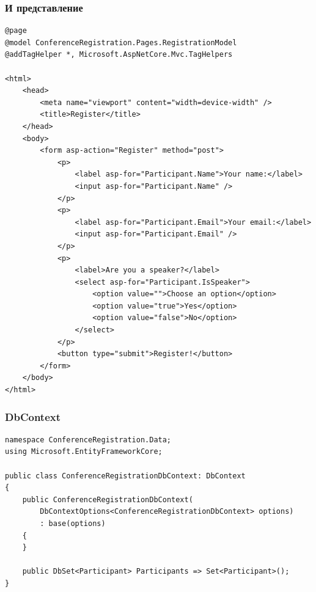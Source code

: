 \documentclass{../../slides-style}
\begin{document}
    \begin{frame}[fragile]
        \frametitle{И представление}
        \begin{ssmall}
            \begin{verbatim}
@page
@model ConferenceRegistration.Pages.RegistrationModel
@addTagHelper *, Microsoft.AspNetCore.Mvc.TagHelpers

<html>
    <head>
        <meta name="viewport" content="width=device-width" />
        <title>Register</title>
    </head>
    <body>
        <form asp-action="Register" method="post">
            <p>
                <label asp-for="Participant.Name">Your name:</label>
                <input asp-for="Participant.Name" />
            </p>
            <p>
                <label asp-for="Participant.Email">Your email:</label>
                <input asp-for="Participant.Email" />
            </p>
            <p>
                <label>Are you a speaker?</label>
                <select asp-for="Participant.IsSpeaker">
                    <option value="">Choose an option</option>
                    <option value="true">Yes</option>
                    <option value="false">No</option>
                </select>
            </p>
            <button type="submit">Register!</button>
        </form>
    </body>
</html>
            \end{verbatim}
        \end{ssmall}
    \end{frame}

    \begin{frame}[fragile]
        \frametitle{DbContext}
        \begin{footnotesize}
            \begin{verbatim}
namespace ConferenceRegistration.Data;
using Microsoft.EntityFrameworkCore;

public class ConferenceRegistrationDbContext: DbContext
{
    public ConferenceRegistrationDbContext(
        DbContextOptions<ConferenceRegistrationDbContext> options)
        : base(options)
    {
    }

    public DbSet<Participant> Participants => Set<Participant>();
}
            \end{verbatim}
        \end{footnotesize}
    \end{frame}
\end{document}
